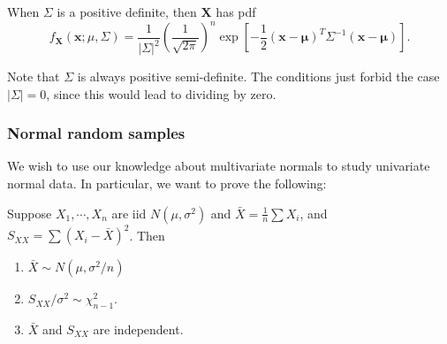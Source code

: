 \documentclass[a4paper]{article}
\begin{document}
\begin{prop}
  When $\Sigma$ is a positive definite, then $\mathbf{X}$ has pdf
  \[
    f_\mathbf{X}(\mathbf{x}; \mu, \Sigma) = \frac{1}{|\Sigma|^2} \left(\frac{1}{\sqrt{2\pi}}\right)^n \exp\left[-\frac{1}{2}(\mathbf{x} - \boldsymbol\mu)^T\Sigma^{-1}(\mathbf{x} - \boldsymbol\mu)\right].
  \]
\end{prop}
Note that $\Sigma$ is always positive semi-definite. The conditions just forbid the case $|\Sigma| = 0$, since this would lead to dividing by zero.

\subsubsection{Normal random samples}
We wish to use our knowledge about multivariate normals to study univariate normal data. In particular, we want to prove the following:

\begin{thm}
  Suppose $X_1, \cdots, X_n$ are iid $N(\mu, \sigma^2)$ and $\bar X = \frac{1}{n} \sum X_i$, and $S_{XX} = \sum (X_i - \bar X)^2$. Then
  \begin{enumerate}
    \item $\bar X \sim N(\mu, \sigma^2/n)$
    \item $S_{XX}/\sigma^2 \sim \chi_{n - 1}^2$.
    \item $\bar X$ and $S_{XX}$ are independent.
  \end{enumerate}
\end{thm}
\end{document}
